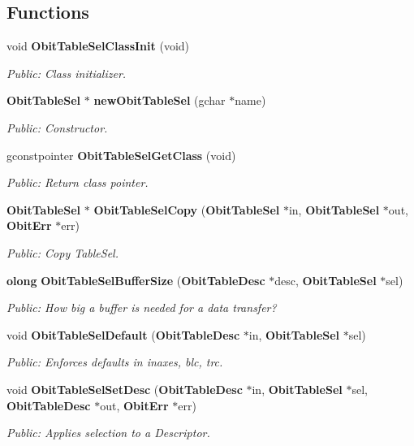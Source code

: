 \subsection*{Functions}
\begin{CompactItemize}
\item 
void {\bf Obit\-Table\-Sel\-Class\-Init} (void)
\begin{CompactList}\small\item\em Public: Class initializer. \item\end{CompactList}\item 
{\bf Obit\-Table\-Sel} $\ast$ {\bf new\-Obit\-Table\-Sel} (gchar $\ast$name)
\begin{CompactList}\small\item\em Public: Constructor. \item\end{CompactList}\item 
gconstpointer {\bf Obit\-Table\-Sel\-Get\-Class} (void)
\begin{CompactList}\small\item\em Public: Return class pointer. \item\end{CompactList}\item 
{\bf Obit\-Table\-Sel} $\ast$ {\bf Obit\-Table\-Sel\-Copy} ({\bf Obit\-Table\-Sel} $\ast$in, {\bf Obit\-Table\-Sel} $\ast$out, {\bf Obit\-Err} $\ast$err)
\begin{CompactList}\small\item\em Public: Copy Table\-Sel. \item\end{CompactList}\item 
{\bf olong} {\bf Obit\-Table\-Sel\-Buffer\-Size} ({\bf Obit\-Table\-Desc} $\ast$desc, {\bf Obit\-Table\-Sel} $\ast$sel)
\begin{CompactList}\small\item\em Public: How big a buffer is needed for a data transfer? \item\end{CompactList}\item 
void {\bf Obit\-Table\-Sel\-Default} ({\bf Obit\-Table\-Desc} $\ast$in, {\bf Obit\-Table\-Sel} $\ast$sel)
\begin{CompactList}\small\item\em Public: Enforces defaults in inaxes, blc, trc. \item\end{CompactList}\item 
void {\bf Obit\-Table\-Sel\-Set\-Desc} ({\bf Obit\-Table\-Desc} $\ast$in, {\bf Obit\-Table\-Sel} $\ast$sel, {\bf Obit\-Table\-Desc} $\ast$out, {\bf Obit\-Err} $\ast$err)
\begin{CompactList}\small\item\em Public: Applies selection to a Descriptor. \item\end{CompactList}\end{CompactItemize}


